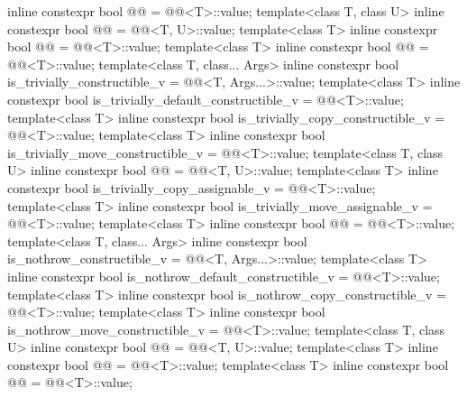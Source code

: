 \begin{codeblock}
{    inline constexpr bool @@ = @@<T>::value;
  template<class T, class U>
    inline constexpr bool @@ = @@<T, U>::value;
  template<class T>
    inline constexpr bool @@ = @@<T>::value;
  template<class T>
    inline constexpr bool @@ = @@<T>::value;
  template<class T, class... Args>
    inline constexpr bool is_trivially_constructible_v
      = @@<T, Args...>::value;
  template<class T>
    inline constexpr bool is_trivially_default_constructible_v
      = @@<T>::value;
  template<class T>
    inline constexpr bool is_trivially_copy_constructible_v
      = @@<T>::value;
  template<class T>
    inline constexpr bool is_trivially_move_constructible_v
      = @@<T>::value;
  template<class T, class U>
    inline constexpr bool @@ = @@<T, U>::value;
  template<class T>
    inline constexpr bool is_trivially_copy_assignable_v
      = @@<T>::value;
  template<class T>
    inline constexpr bool is_trivially_move_assignable_v
      = @@<T>::value;
  template<class T>
    inline constexpr bool @@ = @@<T>::value;
  template<class T, class... Args>
    inline constexpr bool is_nothrow_constructible_v
      = @@<T, Args...>::value;
  template<class T>
    inline constexpr bool is_nothrow_default_constructible_v
      = @@<T>::value;
  template<class T>
    inline constexpr bool is_nothrow_copy_constructible_v
      = @@<T>::value;
  template<class T>
    inline constexpr bool is_nothrow_move_constructible_v
      = @@<T>::value;
  template<class T, class U>
    inline constexpr bool @@ = @@<T, U>::value;
  template<class T>
    inline constexpr bool @@ = @@<T>::value;
  template<class T>
    inline constexpr bool @@ = @@<T>::value;
}
\end{codeblock}
